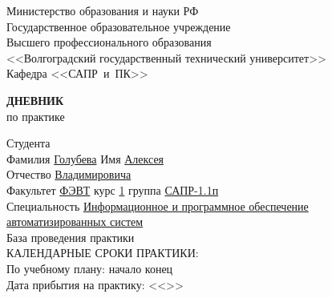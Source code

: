 \begin{titlepage}
    \begin{center}
        Министерство образования и науки РФ \\
        Государственное образовательное учреждение\\
        Высшего профессионального образования\\
        <<Волгоградский государственный технический университет>>\\
        Кафедра <<САПР~и~ПК>>
    \end{center}
    \vspace{0.5cm}
    \begin{center}
        \large \textbf{ДНЕВНИК} \\
        по практике
    \end{center}
    \begin{flushleft}
        Студента\\
        Фамилия \underline{Голубева\hspace{3.1cm}} 
        Имя \underline{Алексея\hspace{2.1cm}}\\
        Отчество \underline{Владимировича\hspace{1.6cm}}\\
        Факультет \underline{ФЭВТ\hspace{3.45cm}} курс \underline{1\hspace{1.5cm}} 
        группа \underline{САПР-1.1п\hspace{2.6cm}}\\
        \vspace{1cm}
        Специальность \underline{Информационное и программное обеспечение\hspace{3.4cm}}\\
        \underline{автоматизированных систем\hspace{10.85cm}}\\
        База проведения практики \underline{\hspace{11.1cm}}\\
        \vspace{1cm}
        КАЛЕНДАРНЫЕ СРОКИ ПРАКТИКИ:\\
        По учебному плану: \hspace{0.2cm} начало \underline{\hspace{4.5cm}} 
        конец \underline{\hspace{4.5cm}}\\
        Дата прибытия на практику: <<\underline{\hspace{1cm}}>> \underline{\hspace{3cm}} 

\end{flushleft}
\end{titlepage}
